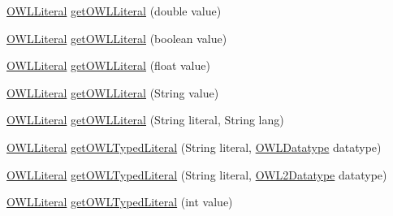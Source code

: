 \begin{DoxyCompactItemize}
\item 
\hyperlink{interfaceorg_1_1semanticweb_1_1owlapi_1_1model_1_1_o_w_l_literal}{O\-W\-L\-Literal} \hyperlink{interfaceorg_1_1semanticweb_1_1owlapi_1_1model_1_1_o_w_l_data_factory_a98566b78734188c65c089ddd8a757bb1}{get\-O\-W\-L\-Literal} (double value)
\item 
\hyperlink{interfaceorg_1_1semanticweb_1_1owlapi_1_1model_1_1_o_w_l_literal}{O\-W\-L\-Literal} \hyperlink{interfaceorg_1_1semanticweb_1_1owlapi_1_1model_1_1_o_w_l_data_factory_a6eff80f8b3bfa26b9c6cd6be24094e9c}{get\-O\-W\-L\-Literal} (boolean value)
\item 
\hyperlink{interfaceorg_1_1semanticweb_1_1owlapi_1_1model_1_1_o_w_l_literal}{O\-W\-L\-Literal} \hyperlink{interfaceorg_1_1semanticweb_1_1owlapi_1_1model_1_1_o_w_l_data_factory_a32cf19904284b6c5ae41abee16770386}{get\-O\-W\-L\-Literal} (float value)
\item 
\hyperlink{interfaceorg_1_1semanticweb_1_1owlapi_1_1model_1_1_o_w_l_literal}{O\-W\-L\-Literal} \hyperlink{interfaceorg_1_1semanticweb_1_1owlapi_1_1model_1_1_o_w_l_data_factory_a349a13a2e7f41923e20d41c8967b377c}{get\-O\-W\-L\-Literal} (String value)
\item 
\hyperlink{interfaceorg_1_1semanticweb_1_1owlapi_1_1model_1_1_o_w_l_literal}{O\-W\-L\-Literal} \hyperlink{interfaceorg_1_1semanticweb_1_1owlapi_1_1model_1_1_o_w_l_data_factory_a6981475d0ea7400e1510f7364040da80}{get\-O\-W\-L\-Literal} (String literal, String lang)
\item 
\hyperlink{interfaceorg_1_1semanticweb_1_1owlapi_1_1model_1_1_o_w_l_literal}{O\-W\-L\-Literal} \hyperlink{interfaceorg_1_1semanticweb_1_1owlapi_1_1model_1_1_o_w_l_data_factory_aa6b0570a7ade63e7b57e4d5c270e6936}{get\-O\-W\-L\-Typed\-Literal} (String literal, \hyperlink{interfaceorg_1_1semanticweb_1_1owlapi_1_1model_1_1_o_w_l_datatype}{O\-W\-L\-Datatype} datatype)
\item 
\hyperlink{interfaceorg_1_1semanticweb_1_1owlapi_1_1model_1_1_o_w_l_literal}{O\-W\-L\-Literal} \hyperlink{interfaceorg_1_1semanticweb_1_1owlapi_1_1model_1_1_o_w_l_data_factory_a91969d3b3c37620614f06668d5dc0557}{get\-O\-W\-L\-Typed\-Literal} (String literal, \hyperlink{enumorg_1_1semanticweb_1_1owlapi_1_1vocab_1_1_o_w_l2_datatype}{O\-W\-L2\-Datatype} datatype)
\item 
\hyperlink{interfaceorg_1_1semanticweb_1_1owlapi_1_1model_1_1_o_w_l_literal}{O\-W\-L\-Literal} \hyperlink{interfaceorg_1_1semanticweb_1_1owlapi_1_1model_1_1_o_w_l_data_factory_a60706a325fd5c2537e68975418da3871}{get\-O\-W\-L\-Typed\-Literal} (int value)

\end{DoxyCompactItemize}
